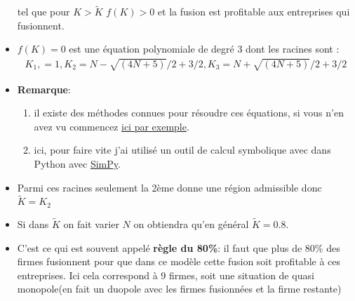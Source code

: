 \documentclass[notes, ignorenonframetext, compress, 10pt, xcolor=svgnames, aspectratio=169]{beamer}
\begin{document}
\begin{frame}[allowframebreaks]{\insertsection}
\begin{itemize}
    tel que pour $K > \tilde{K}$ $f(K) > 0$ et la fusion est profitable aux entreprises qui fusionnent.
    \item $f(K) = 0$ est une équation polynomiale de degré 3 dont les racines sont :
    \begin{align*}
        K_1, =1, K_2 = N - \sqrt{(4N + 5)}/2 + 3/2, K_3 = N + \sqrt{(4N + 5)}/2 + 3/2
    \end{align*}
    \item \textbf{Remarque}: 
    \begin{enumerate}[$\star$]
    \item il existe des méthodes connues pour résoudre ces équations, si vous n'en avez 
    vu commencez \href{https://www.lucaswillems.com/fr/articles/58/equations-troisieme-degre?cache=update}{ici par exemple}.
    \item ici, pour faire vite j'ai utilisé un outil de calcul symbolique avec dans Python avec 
    \href{https://www.sympy.org/en/index.html}{SimPy}.
    \end{enumerate}
    \item Parmi ces racines seulement la 2ème donne une région admissible donc $\tilde{K}=K_2$
    \item Si dans $\tilde{K}$ on fait varier $N$ on obtiendra qu'en général $\tilde{K}=0.8$.
    \item C'est ce qui est souvent appelé \textbf{règle du 80\%}: il faut que plus de 80\% des firmes fusionnent 
    pour que dans ce modèle cette fusion soit profitable à ces entreprises. Ici cela correspond à 9 firmes, 
    soit une situation de quasi monopole(en fait un duopole avec les firmes fusionnées et la firme restante)
\end{itemize}
\end{frame}
\end{document}
